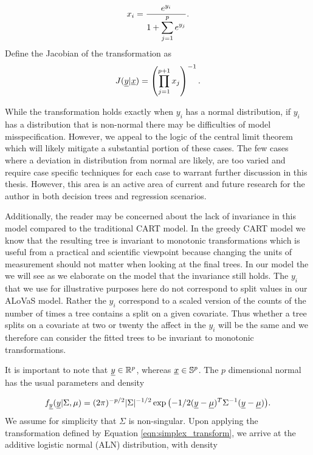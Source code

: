 \begin{equation}\label{eqn:simplex_transform}
x_i = \frac{e^{y_i}}{1+\displaystyle{\sum_{j=1}^pe^{y_j}}}. \\
\end{equation}
Define the Jacobian of the transformation as
\begin{equation}\label{eqn:jacobian}
J(\underline{y} \vert \underline{x}) = \left( \prod_{j=1}^{p+1}x_j \right)^{-1}.
\end{equation}

While the transformation holds exactly when $y_i$ has a normal distribution, if $y_i$ has a distribution that is non-normal there may be difficulties of model misspecification. However, we appeal to the logic of the central limit theorem which will likely mitigate a substantial portion of these cases. The few cases where a deviation in distribution from normal are likely, are too varied and require case specific techniques for each case to warrant further discussion in this thesis. However, this area is an active area of current and future research for the author in both decision trees and regression scenarios. 

Additionally, the reader may be concerned about the lack of invariance in this model compared to the traditional CART model. In the greedy CART model we know that the resulting tree is invariant to monotonic transformations which is useful from a practical and scientific viewpoint because changing the units of measurement should not matter when looking at the final trees. In our model the we will see as we elaborate on the model that the invariance still holds. The $y_i$ that we use for illustrative purposes here do not correspond to split values in our ALoVaS model. Rather the $y_i$ correspond to a scaled version of the counts of the number of times a tree contains a split on a given covariate. Thus whether a tree splits on a covariate at two or twenty the affect in the $y_i$ will be the same and we therefore can consider the fitted trees to be invariant to monotonic transformations. 

 It is important to note that $\underline{y}\in\mathbb{R}^{p}$, whereas $\underline{x}\in\mathbb{S}^{p}$. The $p$ dimensional normal has the usual parameters and density

\begin{equation}\label{eqn:multinormal}
f_{\underline{y}}(\underline{y}\vert \Sigma, \mu)=(2\pi)^{-p/2}|\Sigma|^{-1/2}\exp{\left(-1/2(\underline{y}-\underline{\mu})^T\Sigma^{-1}(\underline{y}-\underline{\mu})\right)}.
\end{equation}
We assume for simplicity that $\Sigma$ is non-singular.
Upon applying the transformation defined by Equation \ref{eqn:simplex_transform}, we arrive at the additive logistic normal (ALN) distribution, with density 

